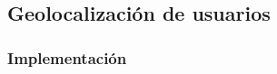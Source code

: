 


\newpage
\subsection{Geolocalización de usuarios}\label{sec:geo}
\subsubsection{Implementación}\label{subsec:geo1}

